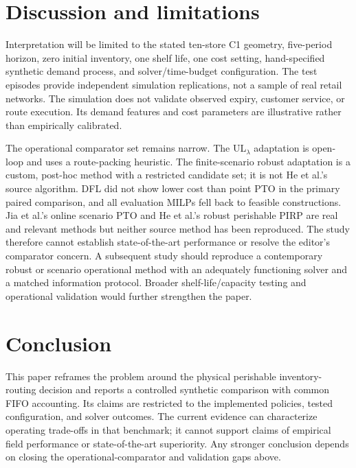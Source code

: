 \documentclass[11pt,a4paper]{article}
\begin{document}
\section{Discussion and limitations}

Interpretation will be limited to the stated ten-store C1 geometry, five-period horizon, zero initial inventory, one shelf life, one cost setting, hand-specified synthetic demand process, and solver/time-budget configuration. The test episodes provide independent simulation replications, not a sample of real retail networks. The simulation does not validate observed expiry, customer service, or route execution. Its demand features and cost parameters are illustrative rather than empirically calibrated.

The operational comparator set remains narrow. The UL$_\lambda$ adaptation is open-loop and uses a route-packing heuristic. The finite-scenario robust adaptation is a custom, post-hoc method with a restricted candidate set; it is not He et al.'s source algorithm. DFL did not show lower cost than point PTO in the primary paired comparison, and all evaluation MILPs fell back to feasible constructions. Jia et al.'s online scenario PTO and He et al.'s robust perishable PIRP are real and relevant methods but neither source method has been reproduced. The study therefore cannot establish state-of-the-art performance or resolve the editor's comparator concern. A subsequent study should reproduce a contemporary robust or scenario operational method with an adequately functioning solver and a matched information protocol. Broader shelf-life/capacity testing and operational validation would further strengthen the paper.

\section{Conclusion}

This paper reframes the problem around the physical perishable inventory-routing decision and reports a controlled synthetic comparison with common FIFO accounting. Its claims are restricted to the implemented policies, tested configuration, and solver outcomes. The current evidence can characterize operating trade-offs in that benchmark; it cannot support claims of empirical field performance or state-of-the-art superiority. Any stronger conclusion depends on closing the operational-comparator and validation gaps above.



\end{document}
